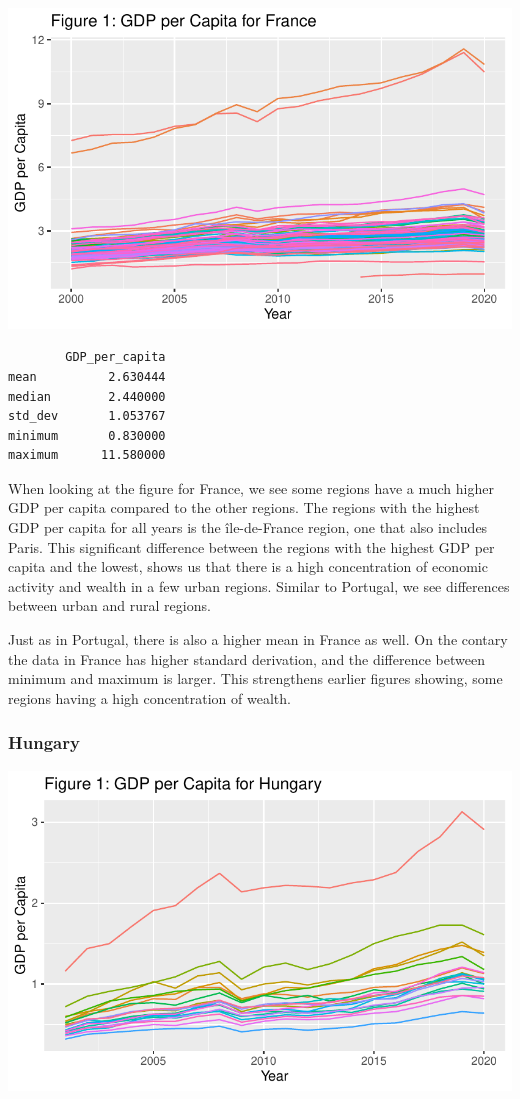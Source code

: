 \documentclass[
  a4paper,
  DIV=11,
  numbers=noendperiod]{scrartcl}
\begin{document}
\includegraphics{MSB104_GR_1_Final_Assignment_research_article_files/figure-pdf/unnamed-chunk-10-1.pdf}

\begin{verbatim}
        GDP_per_capita
mean          2.630444
median        2.440000
std_dev       1.053767
minimum       0.830000
maximum      11.580000
\end{verbatim}

When looking at the figure for France, we see some regions have a much
higher GDP per capita compared to the other regions. The regions with
the highest GDP per capita for all years is the île-de-France region,
one that also includes Paris. This significant difference between the
regions with the highest GDP per capita and the lowest, shows us that
there is a high concentration of economic activity and wealth in a few
urban regions. Similar to Portugal, we see differences between urban and
rural regions.

Just as in Portugal, there is also a higher mean in France as well. On
the contary the data in France has higher standard derivation, and the
difference between minimum and maximum is larger. This strengthens
earlier figures showing, some regions having a high concentration of
wealth.

\hypertarget{hungary}{%
\subsubsection{Hungary}\label{hungary}}

\includegraphics{MSB104_GR_1_Final_Assignment_research_article_files/figure-pdf/unnamed-chunk-13-1.pdf}
\end{document}
